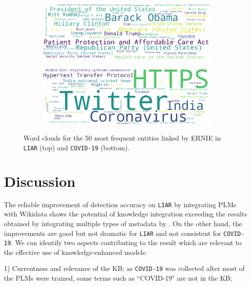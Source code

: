 \documentclass[letterpaper]{article} %
\begin{document}
 \begin{figure}
\centering
\begin{subfigure}[b]{0.46\textwidth}
\centering
\includegraphics[width=\textwidth]{imgs/liar50.png}
\label{fig:e1}
\end{subfigure}
\hfill
\begin{subfigure}[b]{0.46\textwidth}

\includegraphics[width=\textwidth]{imgs/covid50.png}
\label{fig:e2}
\end{subfigure}
\caption{Word clouds for the 50 most frequent entities linked by ERNIE in  \texttt{LIAR} (top) and  \texttt{COVID-19} (bottom).}
\label{fig:word_cloud_Ernie}
\end{figure}



\section{Discussion}

The reliable improvement of detection accuracy on \texttt{LIAR} by integrating PLMs with Wikidata shows the potential of knowledge integration exceeding the results obtained by integrating multiple types of metadata by \citet{wang-2017-liar}.
On the other hand, the improvements are good but not dramatic for \texttt{LIAR} and not consistent for \texttt{COVID-19}.
We can identify two aspects contributing to the result which are relevant to the effective use of knowledge-enhanced models:

1) Currentness and relevance of the KB: as \texttt{COVID-19} was collected after most of the PLMs were trained, some terms such as ``COVID-19" are not in the KB;
\end{document}
